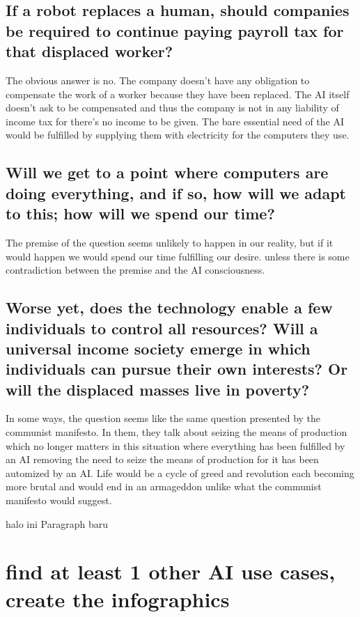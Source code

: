 \documentclass[12pt,titlepage]{article}
\begin{document}
\subsection*{If a robot replaces a human, should companies be required to continue paying payroll tax for that displaced worker?}

The obvious answer is no. The company doesn't have any obligation to compensate the work of a worker because they have been replaced. The AI itself doesn't ask to be compensated and thus the company is not in any liability of income tax for there's no income to be given. The bare essential need of the AI would be fulfilled by supplying them with electricity for the computers they use.

\subsection*{Will we get to a point where computers are doing everything, and if so, how will we adapt to this; how will we spend our time?}

The premise of the question seems unlikely to happen in our reality, but if it would happen we would spend our time fulfilling our desire. unless there is some contradiction between the premise and the AI consciousness.

\subsection*{Worse yet, does the technology enable a few individuals to control all resources? Will a universal income society emerge in which individuals can pursue their own interests? Or will the displaced masses live in poverty?}

In some ways, the question seems like the same question presented by the communist manifesto. In them, they talk about seizing the means of production which no longer matters in this situation where everything has been fulfilled by an AI removing the need to seize the means of production for it has been automized by an AI. Life would be a cycle of greed and revolution each becoming more brutal and would end in an armageddon unlike what the communist manifesto would suggest.


halo ini Paragraph baru
\newpage

\section*{find at least 1 other AI use cases, create the infographics}
\end{document}
